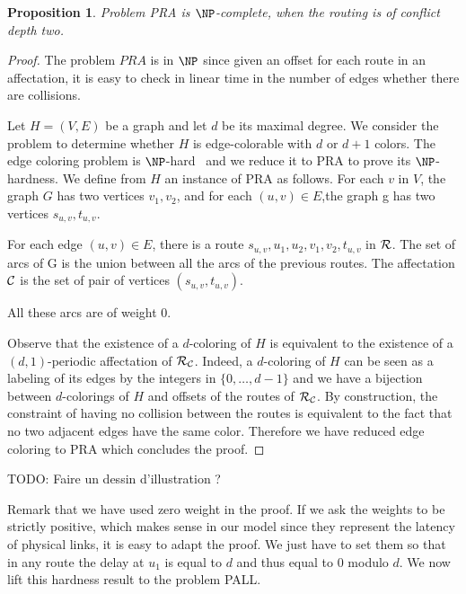\documentclass[a4paper,10pt]{article}
\newtheorem{proposition}{Proposition}
\newcommand{\todo}[1]{{\color{red} TODO: {#1}}}
\begin{document}
 \begin{proposition}
Problem PRA is $\NP$-complete, when the routing is of conflict depth two.
\end{proposition}
 \begin{proof}
 The problem $PRA$ is in $\NP$ since given an offset for each route in an affectation, it is easy to check in linear time in the number of edges whether there are collisions.
 
  Let $H=(V,E)$ be a graph and let $d$ be its maximal degree. We consider the problem to determine whether $H$ is edge-colorable
  with $d$ or $d+1$ colors. The edge coloring problem is $\NP$-hard~\cite{holyer1981np} and we reduce it to PRA to prove its $\NP$-hardness. We define from $H$ an instance of PRA as follows. 
  For each $v$ in $V$, the graph $G$ has two vertices $v_1, v_2$, and for each $(u,v) \in E$,the graph g has two vertices $s_{u,v}, t_{u,v}$.
  
  For each edge $(u,v) \in E$, there is a route $s_{u,v},u_1,u_2,v_1,v_2,t_{u,v}$ in ${\cal R}$.  
  The set of arcs of G is the union between all the arcs of the previous routes.
  The affectation ${\cal C}$ is the set of pair of vertices $(s_{u,v}, t_{u,v})$.
  
  All these arcs are of weight $0$. 
  
    
  Observe that the existence of a $d$-coloring of $H$ is equivalent to the existence of a $(d,1)$-periodic affectation
  of ${\cal R}_{\cal C}$. Indeed, a $d$-coloring of $H$ can be seen as a labeling of its edges by the integers
  in $\{0,\dots,d-1\}$ and we have a bijection between $d$-colorings of $H$ and offsets of the routes of ${\cal R}_{\cal C}$.
  By construction, the constraint of having no collision between the routes is equivalent to the fact that no two adjacent edges have
  the same color. Therefore we have reduced edge coloring to PRA which concludes the proof. 
 \end{proof}
 \todo{Faire un dessin d'illustration ?}
 
 Remark that we have used zero weight in the proof. If we ask the weights to be strictly positive, which makes sense in our model since
they represent the latency of physical links, it is easy to adapt the proof. We just have to set them so that in any route the delay at $u_1$ is equal to $d$ and thus equal to $0$ modulo $d$. We now lift this hardness result to the problem PALL.
\end{document}
